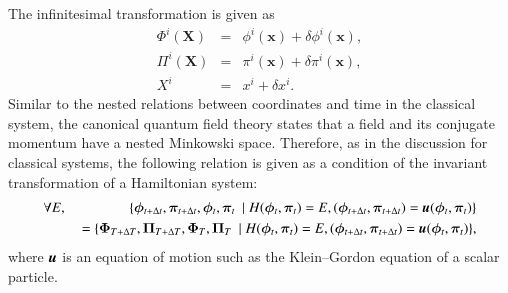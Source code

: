 \documentclass[preprint,
bibnotes,
 amsmath,amssymb,
 aps,
]{revtex4-1}
\newcounter{num}
\begin{document}
The infinitesimal transformation is given as
\begin{eqnarray}
\Phi^i({\bm X}) &=& \phi^i({\bm x}) + \delta \phi^i({\bm x}),\\
\Pi^i({\bm X}) &=& \pi^i({\bm x}) + \delta \pi^i({\bm x}),\\
X^i &=& x^i + \delta x^i. 
\end{eqnarray}
Similar to the nested relations between coordinates and time in the classical system, the canonical quantum field theory states that a field and its conjugate momentum have a nested Minkowski space. 
Therefore, as in the discussion for classical systems, 
the following relation is given as a condition of the invariant transformation of a Hamiltonian system: 
\begin{eqnarray}
\forall E, &\:&\{ {\bm \phi}_{t+\Delta t},{\bm \pi}_{t+\Delta t},{\bm \phi}_t,{\bm \pi}_t\:\mid H({\bm \phi}_t,{\bm \pi}_t) = E,  ({\bm \phi}_{t+\Delta t}, {\bm \pi}_{t+\Delta t}) = \textit{\textbf{u}}({\bm \phi}_t,{\bm \pi}_t)\}\nonumber\\ 
&\:&= \{{\bm \Phi}_{T+\Delta T},{\bm \Pi}_{T+\Delta T},{\bm \Phi}_T,{\bm \Pi}_T\:\mid H({\bm \phi}_t,{\bm \pi}_t) = E,  ({\bm \phi}_{t+\Delta t}, {\bm \pi}_{t+\Delta t}) = \textit{\textbf{u}}({\bm \phi}_t,{\bm \pi}_t)\},\nonumber 
\end{eqnarray}
where $\textit{\textbf{u}}$ is an equation of motion such as the Klein–Gordon equation of a scalar particle. 
\end{document}
